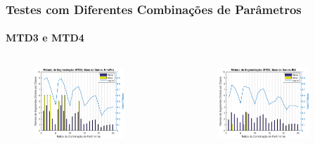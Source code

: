 \documentclass{beamer}
\begin{document}
	\begin{frame}
		\frametitle{Testes com Diferentes Combinações de Parâmetros}
		\framesubtitle{MTD3 e MTD4}
		\begin{columns}[c]
		
			\begin{figure}
				\begin{center}
					\includegraphics[width=0.8\textwidth]{./img/mtd3_nina.eps}
				\end{center}
			\end{figure}
			\begin{figure}
				\begin{center}
					\includegraphics[width=0.8\textwidth]{./img/mtd3_iee.eps}
				\end{center}
			\end{figure}
			

\end{columns}
\end{frame}
\end{document}
